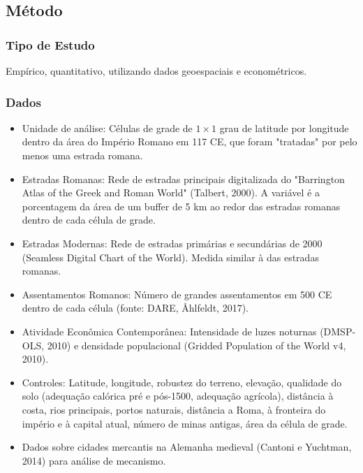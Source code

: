 \documentclass[12pt]{article}
\begin{document}
\subsection*{Método}

\subsubsection*{Tipo de Estudo}
Empírico, quantitativo, utilizando dados geoespaciais e econométricos.

\subsubsection*{Dados}
\begin{itemize}
    \item Unidade de análise: Células de grade de $1 \times 1$ grau de latitude por longitude dentro da área do Império Romano em 117 CE, que foram "tratadas" por pelo menos uma estrada romana.
    \item Estradas Romanas: Rede de estradas principais digitalizada do "Barrington Atlas of the Greek and Roman World" (Talbert, 2000). A variável é a porcentagem da área de um buffer de 5 km ao redor das estradas romanas dentro de cada célula de grade.
    \item Estradas Modernas: Rede de estradas primárias e secundárias de 2000 (Seamless Digital Chart of the World). Medida similar à das estradas romanas.
    \item Assentamentos Romanos: Número de grandes assentamentos em 500 CE dentro de cada célula (fonte: DARE, Åhlfeldt, 2017).
    \item Atividade Econômica Contemporânea: Intensidade de luzes noturnas (DMSP-OLS, 2010) e densidade populacional (Gridded Population of the World v4, 2010).
    \item Controles: Latitude, longitude, robustez do terreno, elevação, qualidade do solo (adequação calórica pré e pós-1500, adequação agrícola), distância à costa, rios principais, portos naturais, distância a Roma, à fronteira do império e à capital atual, número de minas antigas, área da célula de grade.
    \item Dados sobre cidades mercantis na Alemanha medieval (Cantoni e Yuchtman, 2014) para análise de mecanismo.
\end{itemize}
\end{document}

